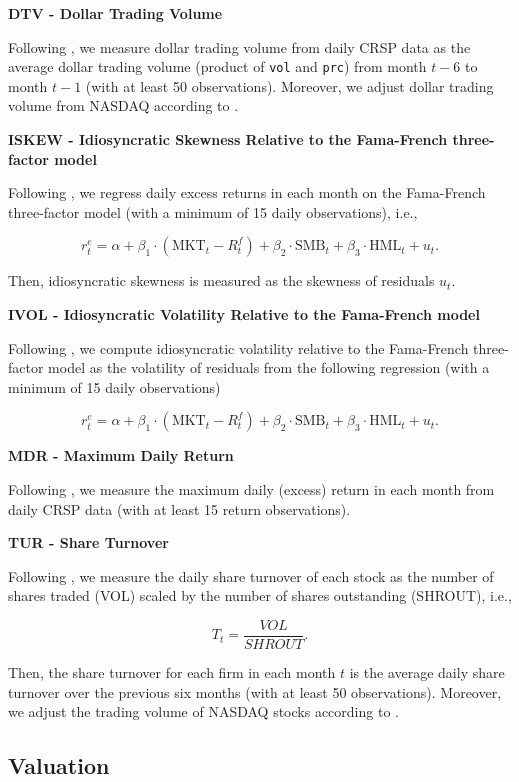 \documentclass[
  article]{jss}
\begin{document}
\textbf{DTV - Dollar Trading Volume}

Following \citet{brennan.1998}, we measure dollar trading volume from
daily CRSP data as the average dollar trading volume (product of
\texttt{vol} and \texttt{prc}) from month \(t-6\) to month \(t-1\) (with
at least 50 observations). Moreover, we adjust dollar trading volume
from NASDAQ according to \citet{gao.2010}.

\textbf{ISKEW - Idiosyncratic Skewness Relative to the Fama-French
three-factor model}

Following \citet{bali.2016}, we regress daily excess returns in each
month on the Fama-French three-factor model (with a minimum of 15 daily
observations), i.e.,

\[
r_{t}^{e} = \alpha + \beta_{1} \cdot (\text{MKT}_{t} - R_{t}^{f}) + \beta_{2} \cdot \text{SMB}_{t} + \beta_{3} \cdot \text{HML}_{t} + u_{t}\text{.}
\]

Then, idiosyncratic skewness is measured as the skewness of residuals
\(u_{t}\).

\textbf{IVOL - Idiosyncratic Volatility Relative to the Fama-French
model}

Following \citet{ang.2006}, we compute idiosyncratic volatility relative
to the Fama-French three-factor model as the volatility of residuals
from the following regression (with a minimum of 15 daily observations)

\[
r_{t}^{e} = \alpha + \beta_{1} \cdot (\text{MKT}_{t} - R_{t}^{f}) + \beta_{2} \cdot \text{SMB}_{t} + \beta_{3} \cdot \text{HML}_{t} + u_{t}\text{.}
\]

\textbf{MDR - Maximum Daily Return}

Following \citet{bali.2011}, we measure the maximum daily (excess)
return in each month from daily CRSP data (with at least 15 return
observations).

\textbf{TUR - Share Turnover}

Following \citet{datar.1998}, we measure the daily share turnover of
each stock as the number of shares traded (VOL) scaled by the number of
shares outstanding (SHROUT), i.e.,

\[
T_{t} = \frac{VOL}{SHROUT}\text{.}
\]

Then, the share turnover for each firm in each month \(t\) is the
average daily share turnover over the previous six months (with at least
50 observations). Moreover, we adjust the trading volume of NASDAQ
stocks according to \citet{gao.2010}.

\subsection{Valuation}\label{valuation}
\end{document}
